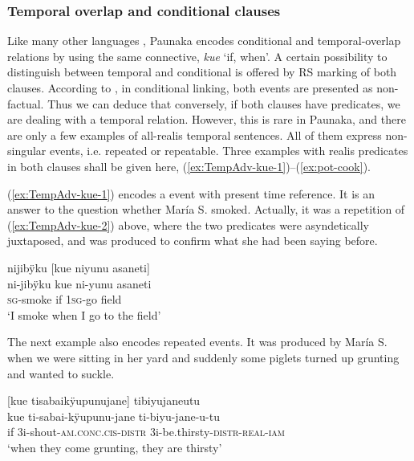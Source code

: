 \subsubsection{Temporal overlap and conditional clauses}\label{sec:AC-kue}


Like many other languages \citep[cf.][161]{Cristofaro2003}, Paunaka encodes conditional and temporal-overlap relations by using the same connective, \textit{kue} ‘if, when’. A certain possibility to distinguish between temporal and conditional is offered by RS marking of both clauses. According to \citet[160]{Cristofaro2003}, in conditional linking, both events are presented as non-factual. Thus we can deduce that conversely, if both clauses have  predicates, we are dealing with a temporal relation. However, this is rare in Paunaka, and there are only a few examples of all-realis temporal sentences. All of them express non-singular events, i.e. repeated or repeatable. Three examples with realis predicates in both clauses shall be given here, (\ref{ex:TempAdv-kue-1})–(\ref{ex:pot-cook}). 

(\ref{ex:TempAdv-kue-1}) encodes a  event with present time reference. It is an answer to the question whether María S. smoked. Actually, it was a repetition of (\ref{ex:TempAdv-kue-2}) above, where the two predicates were asyndetically juxtaposed, and was produced to confirm what she had been saying before.

\ea\label{ex:TempAdv-kue-1}
\begingl
\glpreamble nijibÿku \textup{[}kue niyunu asaneti\textup{]}\\
\gla ni-jibÿku kue ni-yunu asaneti\\
\textsc{sg}-smoke if 1\textsc{sg}-go field\\
\glft ‘I smoke when I go to the field’
\endgl
\trailingcitation{[rxx-e120511l.391]}%
\xe

The next example also encodes repeated events. It was produced by María S. when we were sitting in her yard and suddenly some piglets turned up grunting and wanted to suckle.

\ea\label{ex:real-kue-1}
\begingl
\glpreamble \textup{[}kue tisabaikÿupunujane\textup{]} tibiyujaneutu\\
\gla kue ti-sabai-kÿupunu-jane ti-biyu-jane-u-tu\\
\glb if 3i-shout-\textsc{am.conc.cis}-\textsc{distr} 3i-be.thirsty-\textsc{distr}-\textsc{real}-\textsc{iam}\\
\glft ‘when they come grunting, they are thirsty’
\endgl
\trailingcitation{[rmx-e150922l.157]}
\xe

